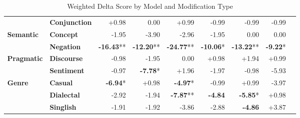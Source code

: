 \begin{table}[h]
{\begin{tabular}{llrrrrrrr}
 & \textbf{Conjunction} & \cellcolor{green!2} +0.98 & \cellcolor{red!0} 0.00 & \cellcolor{green!2} +0.99 & \cellcolor{red!5} -0.99 & \cellcolor{red!5} -0.99 & \cellcolor{red!5} -0.99 \\
\textbf{Semantic} & \textbf{Concept} & \cellcolor{red!11} -1.95 & \cellcolor{red!23} -3.90 & \cellcolor{red!17} -2.96 & \cellcolor{red!11} -1.95 & \cellcolor{red!0} 0.00 & \cellcolor{red!0} 0.00 \\
 & \textbf{Negation} & \cellcolor{red!30} \textbf{-16.43}** & \cellcolor{red!30} \textbf{-12.20}** & \cellcolor{red!30} \textbf{-24.77}** & \cellcolor{red!30} \textbf{-10.06}* & \cellcolor{red!30} \textbf{-13.22}** & \cellcolor{red!30} \textbf{-9.22}* \\
\textbf{Pragmatic} & \textbf{Discourse} & \cellcolor{red!5} -0.98 & \cellcolor{red!11} -1.95 & \cellcolor{red!0} 0.00 & \cellcolor{green!2} +0.98 & \cellcolor{green!5} +1.94 & \cellcolor{green!2} +0.99 \\
 & \textbf{Sentiment} & \cellcolor{red!5} -0.97 & \cellcolor{red!30} \textbf{-7.78}* & \cellcolor{green!5} +1.96 & \cellcolor{red!11} -1.97 & \cellcolor{red!5} -0.98 & \cellcolor{red!30} -5.93 \\
\textbf{Genre} & \textbf{Casual} & \cellcolor{red!30} \textbf{-6.94}* & \cellcolor{green!2} +0.98 & \cellcolor{red!29} \textbf{-4.97}* & \cellcolor{red!5} -0.99 & \cellcolor{green!2} +0.99 & \cellcolor{red!23} -3.97 \\
 & \textbf{Dialectal} & \cellcolor{red!17} -2.92 & \cellcolor{red!11} -1.94 & \cellcolor{red!30} \textbf{-7.87}** & \cellcolor{red!29} \textbf{-4.84} & \cellcolor{red!30} \textbf{-5.85}* & \cellcolor{green!2} +0.98 \\
 & \textbf{Singlish} & \cellcolor{red!11} -1.91 & \cellcolor{red!11} -1.92 & \cellcolor{red!23} -3.86 & \cellcolor{red!17} -2.88 & \cellcolor{red!29} \textbf{-4.86} & \cellcolor{green!11} +3.87 \\
\hline
\end{tabular}}
\caption{Weighted Delta Score by Model and Modification Type}
\label{tab:ner_results}
\end{table}